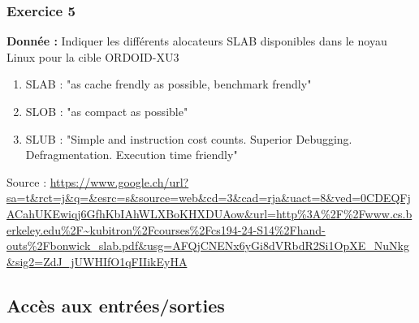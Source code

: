 \subsubsection{Exercice 5}
\noindent
\textbf{Donnée : }Indiquer les différents alocateurs SLAB disponibles dans le noyau Linux pour la cible ORDOID-XU3
\begin{enumerate}
	\item SLAB : "as cache frendly as possible, benchmark frendly"
	\item SLOB : "as compact as possible"
	\item SLUB : "Simple and instruction cost counts. Superior Debugging. Defragmentation. Execution time friendly"
\end{enumerate}
Source : \url{https://www.google.ch/url?sa=t&rct=j&q=&esrc=s&source=web&cd=3&cad=rja&uact=8&ved=0CDEQFjACahUKEwiqj6GfhKbIAhWLXBoKHXDUAow&url=http%3A%2F%2Fwww.cs.berkeley.edu%2F~kubitron%2Fcourses%2Fcs194-24-S14%2Fhand-outs%2Fbonwick_slab.pdf&usg=AFQjCNENx6yGi8dVRbdR2Si1OpXE_NuNkg&sig2=ZdJ_jUWHIfO1qFIIikEyHA}
	
\subsection{Accès aux entrées/sorties}
